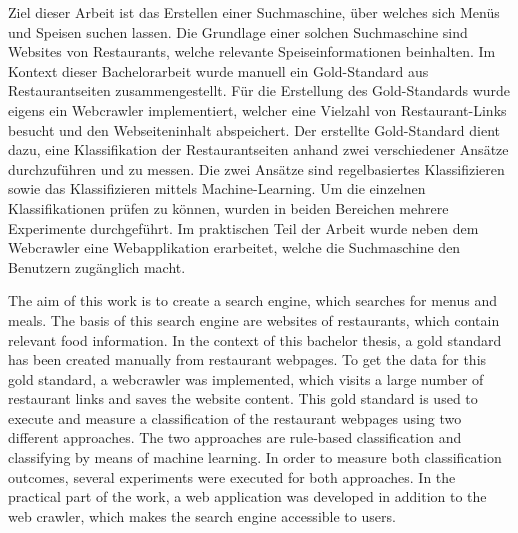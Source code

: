 
Ziel dieser Arbeit ist das Erstellen einer Suchmaschine, über welches sich Menüs und Speisen suchen lassen.
Die Grundlage einer solchen Suchmaschine sind Websites von Restaurants, welche relevante Speiseinformationen beinhalten.
Im Kontext dieser Bachelorarbeit wurde manuell ein Gold-Standard aus Restaurantseiten zusammengestellt.
Für die Erstellung des Gold-Standards wurde eigens ein Webcrawler implementiert, welcher eine Vielzahl von Restaurant-Links besucht und den Webseiteninhalt abspeichert.
Der erstellte Gold-Standard dient dazu, eine Klassifikation der Restaurantseiten anhand zwei verschiedener Ansätze durchzuführen und zu messen.
Die zwei Ansätze sind regelbasiertes Klassifizieren sowie das Klassifizieren mittels Machine-Learning.
Um die einzelnen Klassifikationen prüfen zu können, wurden in beiden Bereichen mehrere Experimente durchgeführt.
Im praktischen Teil der Arbeit wurde neben dem Webcrawler eine Webapplikation erarbeitet, welche die Suchmaschine den Benutzern zugänglich macht.

The aim of this work is to create a search engine, which searches for menus and meals.
The basis of this search engine are websites of restaurants, which contain relevant food information.
In the context of this bachelor thesis, a gold standard has been created manually from restaurant webpages.
To get the data for this gold standard, a webcrawler was implemented, which visits a large number of restaurant links and saves the website content.
This gold standard is used to execute and measure a classification of the restaurant webpages using two different approaches.
The two approaches are rule-based classification and classifying by means of machine learning.
In order to measure both classification outcomes, several experiments were executed for both approaches.
In the practical part of the work, a web application was developed in addition to the web crawler, which makes the search engine accessible to users.
